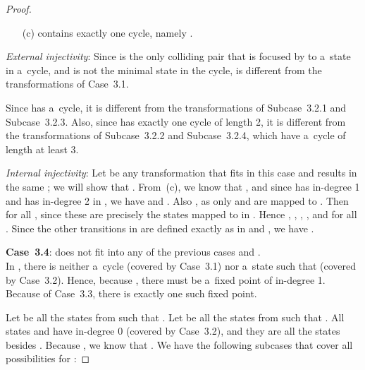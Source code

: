 \documentclass{amsart}
\begin{document}
\begin{proof}
\begin{enumerate}
\item[(c)]  contains exactly one cycle, namely .
\end{enumerate}

\textit{External injectivity}:
Since  is the only colliding pair that is focused by  to a~state in a~cycle, and  is not the minimal state in the cycle,  is different from the transformations of Case~3.1.

Since  has a~cycle, it is different from the transformations of Subcase~3.2.1 and Subcase~3.2.3.
Also, since  has exactly one cycle of length 2, it is different from the transformations of Subcase~3.2.2 and Subcase~3.2.4, which have a~cycle of length at least 3.

\textit{Internal injectivity}:
Let  be any transformation that fits in this case and results in the same ; we will show that .
From~(c), we know that , and since  has in-degree 1 and  has in-degree 2 in , we have  and .
Also , as only  and  are mapped to .
Then  for all , since these are precisely the states mapped to  in .
Hence , , , , and  for all .
Since the other transitions in  are defined exactly as in  and , we have .

\textbf{Case~3.4}:  does not fit into any of the previous cases and .\\
In , there is neither a~cycle (covered by Case~3.1) nor a~state  such that  (covered by Case~3.2).
Hence, because , there must be a~fixed point  of in-degree 1.
Because of Case~3.3, there is exactly one such fixed point.

Let  be all the states from  such that .
Let  be all the states from  such that .
All states  and  have in-degree 0 (covered by Case~3.2), and they are all the states besides .
Because , we know that .
We have the following subcases that cover all possibilities for :


\end{proof}
\end{document}
